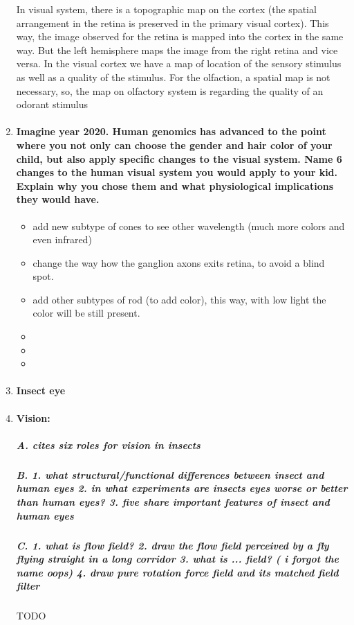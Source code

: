 \documentclass[12pt,article,oneside,a4paper]{memoir}
\begin{document}
\begin{enumerate}
In visual system, there is a topographic map on the cortex (the spatial arrangement in the retina is preserved in the primary visual cortex). This way, the image observed for the retina is mapped into the cortex in the same way. But the left hemisphere maps the image from the right retina and vice versa. In the visual cortex we have a map of location of the sensory stimulus as well as a quality of the stimulus.
For the olfaction, a spatial map is not necessary, so, the map on olfactory system is regarding the quality of an odorant stimulus

\item \paragraph{Imagine year 2020. Human genomics has advanced to the point where you
not only can choose the gender and hair color of your child, but also apply specific
changes to the visual system. Name 6 changes to the human visual system you would apply to your kid. Explain why you chose them and what physiological implications they would have.}\label{question:year2020}

\begin{itemize}
\item add new subtype of cones to see other wavelength (much more colors and even infrared)
\item change the way how the ganglion axons exits retina, to avoid a blind spot.
\item add other subtypes of rod (to add color), this way, with low light the color will be still present.
\item 
\item
\item
\end{itemize}

\item \paragraph{Insect eye} 

\item \paragraph{Vision:}
\subparagraph{A. cites six roles for vision in insects}
\subparagraph{B. 1. what structural/functional differences between insect and human eyes 2. in what experiments are insects eyes worse or better than human eyes? 3. five share important features of insect and human eyes}
\subparagraph{C. 1. what is flow field? 2. draw the flow field perceived by a fly flying straight in a long corridor 3. what is ... field? ( i forgot the name oops) 4. draw pure rotation force field and its matched field filter} TODO


\end{enumerate}
\end{document}
